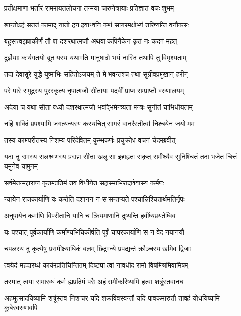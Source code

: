 \twolineshloka
{प्रतीक्षमाणा भर्तारं राममायतलोचना}
{तन्मया चारुनेत्रायाः प्रतिज्ञातं वचः शुभम्} %

\twolineshloka
{श्रान्तोऽहं सततं कामाद् यातो हय इवाध्वनि}
{कथं सागरमक्षोभ्यं तरिष्यन्ति वनौकसः} %

\twolineshloka
{बहुसत्त्वझषाकीर्णं तौ वा दशरथात्मजौ}
{अथवा कपिनैकेन कृतं नः कदनं महत्} %

\twolineshloka
{दुर्ज्ञेयाः कार्यगतयो ब्रूत यस्य यथामति}
{मानुषान्नो भयं नास्ति तथापि तु विमृश्यताम्} %

\twolineshloka
{तदा देवासुरे युद्धे युष्माभिः सहितोऽजयम्}
{ते मे भवन्तश्च तथा सुग्रीवप्रमुखान् हरीन्} %

\twolineshloka
{परे पारे समुद्रस्य पुरस्कृत्य नृपात्मजौ}
{सीतायाः पदवीं प्राप्य सम्प्राप्तौ वरुणालयम्} %

\twolineshloka
{अदेया च यथा सीता वध्यौ दशरथात्मजौ}
{भवद्भिर्मन्त्र्यतां मन्त्रः सुनीतं चाभिधीयताम्} %

\twolineshloka
{नहि शक्तिं प्रपश्यामि जगत्यन्यस्य कस्यचित्}
{सागरं वानरैस्तीर्त्वा निश्चयेन जयो मम} %

\twolineshloka
{तस्य कामपरीतस्य निशम्य परिदेवितम्}
{कुम्भकर्णः प्रचुक्रोध वचनं चेदमब्रवीत्} %

\twolineshloka
{यदा तु रामस्य सलक्ष्मणस्य प्रसह्य सीता खलु सा इहाहृता}
{सकृत् समीक्ष्यैव सुनिश्चितं तदा भजेत चित्तं यमुनेव यामुनम्} %

\twolineshloka
{सर्वमेतन्महाराज कृतमप्रतिमं तव}
{विधीयेत सहास्माभिरादावेवास्य कर्मणः} %

\twolineshloka
{न्यायेन राजकार्याणि यः करोति दशानन}
{न स सन्तप्यते पश्चान्निश्चितार्थमतिर्नृपः} %

\twolineshloka
{अनुपायेन कर्माणि विपरीतानि यानि च}
{क्रियमाणानि दुष्यन्ति हवींष्यप्रयतेष्विव} %

\twolineshloka
{यः पश्चात् पूर्वकार्याणि कर्माण्यभिचिकीर्षति}
{पूर्वं चापरकार्याणि स न वेद नयानयौ} %

\twolineshloka
{चपलस्य तु कृत्येषु प्रसमीक्ष्याधिकं बलम्}
{छिद्रमन्ये प्रपद्यन्ते क्रौञ्चस्य खमिव द्विजाः} %

\twolineshloka
{त्वयेदं महदारब्धं कार्यमप्रतिचिन्तितम्}
{दिष्ट्या त्वां नावधीद् रामो विषमिश्रमिवामिषम्} %

\twolineshloka
{तस्मात् त्वया समारब्धं कर्म ह्यप्रतिमं परैः}
{अहं समीकरिष्यामि हत्वा शत्रूंस्तवानघ} %

\threelineshloka
{अहमुत्सादयिष्यामि शत्रूंस्तव निशाचर}
{यदि शक्रविवस्वन्तौ यदि पावकमारुतौ}
{तावहं योधयिष्यामि कुबेरवरुणावपि} %

